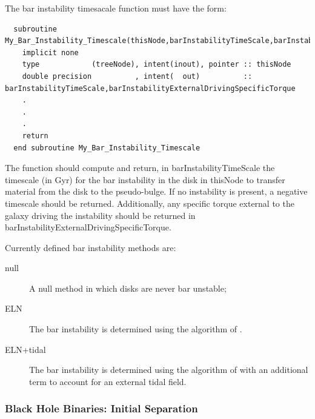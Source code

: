 The bar instability timesacale function must have the form:
\begin{verbatim}
  subroutine My_Bar_Instability_Timescale(thisNode,barInstabilityTimeScale,barInstabilityExternalDrivingSpecificTorque)
    implicit none
    type            (treeNode), intent(inout), pointer :: thisNode
    double precision          , intent(  out)          :: barInstabilityTimeScale,barInstabilityExternalDrivingSpecificTorque
    .
    .
    .
    return
  end subroutine My_Bar_Instability_Timescale
\end{verbatim}
The function should compute and return, in {\normalfont \ttfamily barInstabilityTimeScale} the timescale (in Gyr) for the bar instability in the disk in {\normalfont \ttfamily thisNode} to transfer material from the disk to the pseudo-bulge. If no instability is present, a negative timescale should be returned. Additionally, any specific torque external to the galaxy driving the instability should be returned in {\normalfont \ttfamily barInstabilityExternalDrivingSpecificTorque}.

Currently defined bar instability methods are:
\begin{description}
 \item [{\normalfont \ttfamily null}] A null method in which disks are never bar unstable;
 \item [{\normalfont \ttfamily ELN}] The bar instability is determined using the algorithm of \cite{efstathiou_stability_1982}.
 \item [{\normalfont \ttfamily ELN+tidal}] The bar instability is determined using the algorithm of \cite{efstathiou_stability_1982} with an additional term to account for an external tidal field.
\end{description}

\subsubsection{Black Hole Binaries: Initial Separation}

